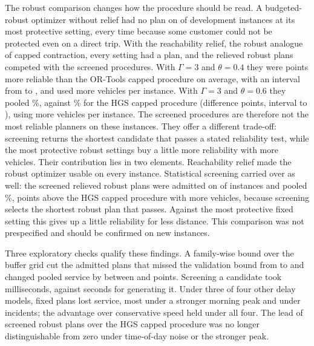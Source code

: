 \documentclass[11pt,a4paper]{article}
\begin{document}
The robust comparison changes how the procedure should be read. A budgeted-robust
optimizer without relief had no plan on \RobNoPlanBoxSix{} of \RobInstances{}
development instances at its most protective setting, every time because some
customer could not be protected even on a direct trip. With the reachability
relief, the robust analogue of capped contraction, every setting had a plan, and
the relieved robust plans competed with the screened procedures. With $\Gamma=3$
and $\theta=0.4$ they were \RobCapGThreeFourMinusOrt{} points more reliable than
the OR-Tools capped procedure on average, with an interval from
\RobCapGThreeFourMinusOrtLo{} to \RobCapGThreeFourMinusOrtHi{}, and used
\RobCapGThreeFourMinusOrtFleet{} more vehicles per instance. With $\Gamma=3$ and
$\theta=0.6$ they pooled \RobCapGThreeSixP\%, against \RobHgsCappedP\% for the HGS
capped procedure (difference \RobCapGThreeSixMinusHgs{} points, interval
\RobCapGThreeSixMinusHgsLo{} to \RobCapGThreeSixMinusHgsHi{}), using
\RobCapGThreeSixMinusHgsFleet{} more vehicles per instance. The screened
procedures are therefore not the most reliable planners on these instances.
They offer a different trade-off: screening returns the shortest candidate that
passes a stated reliability test, while the most protective robust settings buy
a little more reliability with more vehicles. Their contribution lies in two
elements. Reachability relief
made the robust optimizer usable on every instance. Statistical screening carried
over as well: the screened relieved robust plans were admitted on
\RobScreenedCapAdm{} of \RobInstances{} instances and pooled \RobScreenedCapP\%,
\RobScreenedCapMinusHgs{} points above the HGS capped procedure with
\RobScreenedCapMinusHgsFleet{} more vehicles, because screening selects the
shortest robust plan that passes. Against the most protective fixed setting this
gives up a little reliability for less distance. This comparison was
not prespecified and should be confirmed on new instances.

Three exploratory checks qualify these findings. A family-wise bound over the
buffer grid cut the admitted plans that missed the validation bound from
\FwMissOrig{} to \FwMissFw{} and changed pooled service by between
\FwPooledChangeMin{} and \FwPooledChangeMax{} points. Screening a candidate took
milliseconds, against seconds for generating it. Under three of four other delay
models, fixed plans lost service, most under a stronger morning peak and under
incidents; the advantage over conservative speed held under all four. The lead
of screened robust plans over the HGS capped procedure was no longer
distinguishable from zero under time-of-day noise or the stronger peak.
\end{document}
